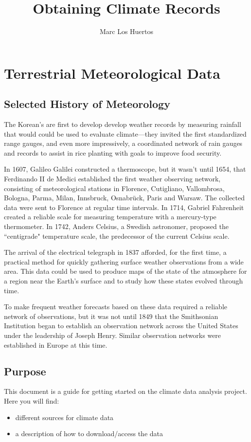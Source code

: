 \documentclass{article}\usepackage[]{graphicx}\usepackage[]{color}
\title{Obtaining Climate Records}
\author{Marc Los Huertos}
\begin{document}
\maketitle

\section{Terrestrial Meteorological Data}

\subsection{Selected History of Meteorology}

The Korean's are first to develop develop weather records by measuring rainfall that would could be used to evaluate climate---they invited the first standardized range gauges, and even more impressively, a coordinated network of rain gauges and records to assist in rice planting with goals to improve food security.

In 1607, Galileo Galilei constructed a thermoscope, but it wasn't until 1654, that Ferdinando II de Medici established the first weather observing network, consisting of meteorological stations in Florence, Cutigliano, Vallombrosa, Bologna, Parma, Milan, Innsbruck, Osnabrück, Paris and Warsaw. The collected data were sent to Florence at regular time intervals. In 1714, Gabriel Fahrenheit created a reliable scale for measuring temperature with a mercury-type thermometer. In 1742, Anders Celsius, a Swedish astronomer, proposed the ``centigrade" temperature scale, the predecessor of the current Celsius scale.

The arrival of the electrical telegraph in 1837 afforded, for the first time, a practical method for quickly gathering surface weather observations from a wide area. This data could be used to produce maps of the state of the atmosphere for a region near the Earth's surface and to study how these states evolved through time. 

To make frequent weather forecasts based on these data required a reliable network of observations, but it was not until 1849 that the Smithsonian Institution began to establish an observation network across the United States under the leadership of Joseph Henry. Similar observation networks were established in Europe at this time. 

\subsection{Purpose}
This document is a guide for getting started on the climate data analysis project. Here you will find: 
\begin{itemize}
\item different sources for climate data
\item a description of how to download/access the data
\end{itemize}
\end{document}
